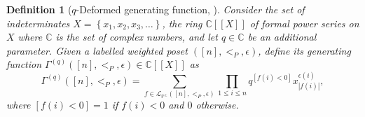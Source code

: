 \documentclass[submission]{FPSAC2023}
\newtheorem{defn}{Definition}
\newcommand{\CC}{\mathbb{C}} %
\newcommand{\PP}{\mathbb{P}} %
\begin{document}
\begin{defn}[$q$-Deformed generating function, \cite{GriVas22}]
Consider the set of indeterminates $X = \left\{x_1,x_2,x_3,\ldots\right\}$, the ring $\CC \left[\left[ X \right]\right]$ of formal power series on $X$ where $\CC$ is the set of complex numbers, and let $q \in \CC$ be an additional parameter. Given a labelled weighted poset $([n], <_P, \epsilon)$, define its generating function $\Gamma^{(q)}([n], <_P, \epsilon) \in \CC \left[\left[ X \right]\right]$ as
\begin{equation*}
\label{eq : weightGamma}
\Gamma^{(q)}([n], <_P, \epsilon) = \sum_{f\in\mathcal{L}_{\PP^\pm}([n],<_{P}, \epsilon)} \prod_{1\leq i\leq n}q^{[f(i)<0]}x_{|f(i)|}^{\epsilon(i)},
\end{equation*}
where $[f(i)<0] = 1$ if $f(i)<0$ and $0$ otherwise.
\end{defn}

\end{document}
